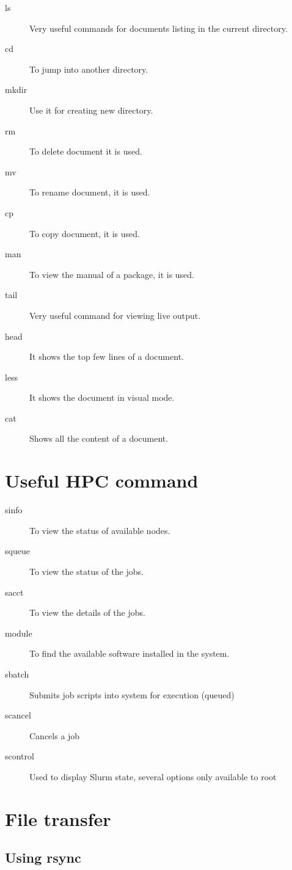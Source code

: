 \documentclass{book}
\begin{document}
\begin{description}
	\item[ls] Very useful commands for documents listing in the current directory.
	\item[cd] To jump into another directory.
	\item[mkdir] Use it for creating new directory.
	\item[rm] To delete document it is used.
	\item[mv] To rename document, it is used.
	\item[cp] To copy document, it is used.
	\item[man] To view the manual of a package, it is used.
	\item[tail] Very useful command for viewing live output.
	\item[head] It shows the top few lines of a document.
	\item[less] It shows the document in visual mode.
	\item[cat] Shows all the content of a document.

\end{description} 

\section{Useful HPC command}%
\label{sec:useful_hpc_command} 
\begin{description} 
	\item[sinfo] To view the status of available nodes.
	\item[squeue] To view the status of the jobs.
	\item[sacct] To view the details of the jobs.
	\item[module] To find the available software installed in the system.
	\item[sbatch] Submits job scripts into system for execution (queued)
	\item[scancel]Cancels a job
	\item[scontrol] Used to display Slurm state, several options only available to root
\end{description}

\section{File transfer}%
\label{sec:file_transfer}

\subsection{Using rsync}%
\label{sub:using_rsync}
\end{document}
